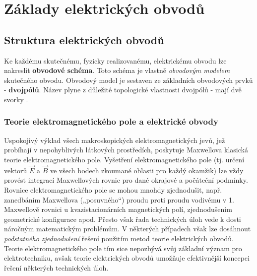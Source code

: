 \setchaptertoc
\chapter{Základy elektrických obvodů}
  \section{Struktura elektrických ob\-vo\-dů}
    Ke každému skutečnému, fyzicky realizovanému, elektrickému obvodu lze nakreslit 
    \textbf{obvodové schéma}. Toto schéma je vlastně \emph{obvodovým modelem} skutečného obvodu. 
    Obvodový model je sestaven ze základních obvodových prvků - \textbf{dvojpólů}. Název plyne z 
    důležité topologické vlastnosti dvojpólů - mají dvě svorky \cite[s.~12]{Patocka2}.
    
    \subsection{Teorie elektromagnetického pole a elektrické obvody}
      Uspokojivý výklad všech makroskopických elektromagnetických jevů, jež probíhají v 
      nepohyblivých látkových prostředích, poskytuje Maxwellova klasická teorie elektromagnetického 
      pole. Vyšetření elektromagnetického pole (tj. určení vektorů \(\vec{E}\) a \(\vec{B}\) ve 
      všech bodech zkoumané oblasti pro každý okamžik) lze vždy provést integrací Maxwellových 
      rovnic pro dané okrajové a počáteční podmínky. Rovnice elektromagnetického pole se mohou 
      mnohdy zjednodušit, např. zanedbáním Maxwellova („posuvného“) proudu proti proudu vodivému v 
      1. Maxwellově rovnici u kvazistacionárních magnetických polí, zjednodušením geometrické 
      konfigurace apod. Přesto však řada technických úloh vede k dosti náročným matematickým 
      problémům. V některých případech však lze dosáhnout \emph{podstatného zjednodušení} řešení 
      použitím metod teorie elektrických obvodů. Teorie elektromagnetického pole tím sice nepozbývá 
      svůj základní význam pro elektrotechniku, avšak teorie elektrických obvodů umožňuje 
      efektivnější koncepci řešení některých technických úloh.
      
